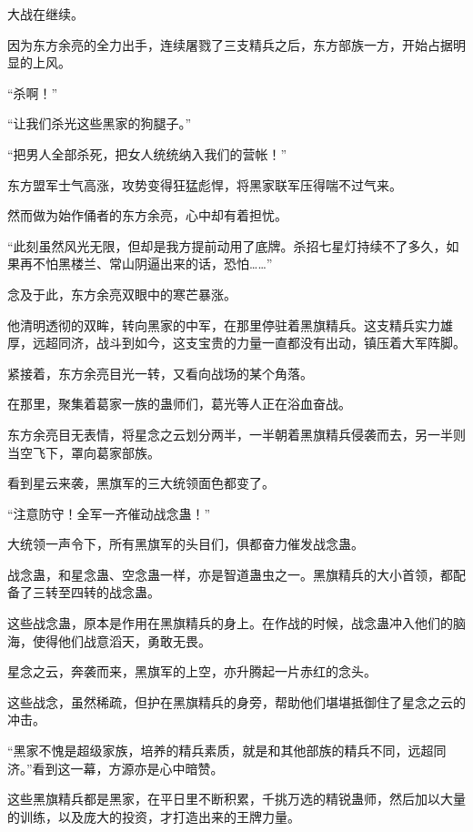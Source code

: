 
\begin{this_body}



大战在继续。

因为东方余亮的全力出手，连续屠戮了三支精兵之后，东方部族一方，开始占据明显的上风。

“杀啊！”

“让我们杀光这些黑家的狗腿子。”

“把男人全部杀死，把女人统统纳入我们的营帐！”

东方盟军士气高涨，攻势变得狂猛彪悍，将黑家联军压得喘不过气来。

然而做为始作俑者的东方余亮，心中却有着担忧。

“此刻虽然风光无限，但却是我方提前动用了底牌。杀招七星灯持续不了多久，如果再不怕黑楼兰、常山阴逼出来的话，恐怕……”

念及于此，东方余亮双眼中的寒芒暴涨。

他清明透彻的双眸，转向黑家的中军，在那里停驻着黑旗精兵。这支精兵实力雄厚，远超同济，战斗到如今，这支宝贵的力量一直都没有出动，镇压着大军阵脚。

紧接着，东方余亮目光一转，又看向战场的某个角落。

在那里，聚集着葛家一族的蛊师们，葛光等人正在浴血奋战。

东方余亮目无表情，将星念之云划分两半，一半朝着黑旗精兵侵袭而去，另一半则当空飞下，罩向葛家部族。

看到星云来袭，黑旗军的三大统领面色都变了。

“注意防守！全军一齐催动战念蛊！”

大统领一声令下，所有黑旗军的头目们，俱都奋力催发战念蛊。

战念蛊，和星念蛊、空念蛊一样，亦是智道蛊虫之一。黑旗精兵的大小首领，都配备了三转至四转的战念蛊。

这些战念蛊，原本是作用在黑旗精兵的身上。在作战的时候，战念蛊冲入他们的脑海，使得他们战意滔天，勇敢无畏。

星念之云，奔袭而来，黑旗军的上空，亦升腾起一片赤红的念头。

这些战念，虽然稀疏，但护在黑旗精兵的身旁，帮助他们堪堪抵御住了星念之云的冲击。

“黑家不愧是超级家族，培养的精兵素质，就是和其他部族的精兵不同，远超同济。”看到这一幕，方源亦是心中暗赞。

这些黑旗精兵都是黑家，在平日里不断积累，千挑万选的精锐蛊师，然后加以大量的训练，以及庞大的投资，才打造出来的王牌力量。


\end{this_body}
